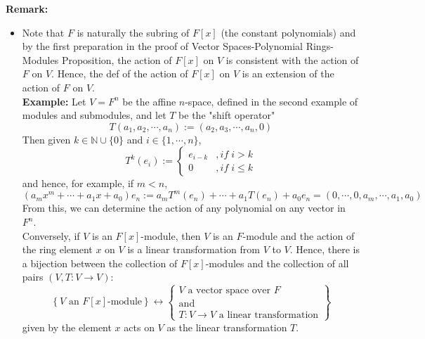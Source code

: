 \noindent\textbf{Remark:}
\begin{itemize}
    \item Note that $F$ is naturally the subring of $F[x]$ (the constant polynomials) and by the first preparation in the proof of Vector Spaces-Polynomial Rings-Modules Proposition, the action of $F[x]$ on $V$ is consistent with the action of $F$ on $V$. Hence, the def of the action of $F[x]$ on $V$ is an extension of the action of $F$ on $V$.
    \vspace{1em}\\
    
    \noindent\textbf{Example:} Let $V=F^n$ be the affine $n$-space, defined in the second example of modules and submodules, and let $T$ be the "shift operator"
    $$T(a_1 ,a_2,\cdots, a_n) := (a_2 ,a_3 ,\cdots, a_n ,0)$$
    Then given $k \in \mathbb{N} \cup \{0\}$ and $i \in \{ 1 ,\cdots, n\}$, 
    $$T^k (e_i) := \begin{cases}
        e_{i-k} &,if\;i>k\\
        0 &,if\; i \leq k
    \end{cases}$$
    and hence, for example, if $m<n$,
    $$(a_m x^m + \cdots + a_1 x+a_0) e_n := a_m T^m (e_n) + \cdots + a_1 T(e_n)+a_0 e_n = (0, \cdots, 0,a_m ,\cdots, a_1,a_0)$$
    From this, we can determine the action of any polynomial on any vector in $F^n$.
    \vspace{1em}\\
    
    \noindent Conversely, if $V$ is an $F[x]$-module, then $V$ is an $F$-module and the action of the ring element $x$ on $V$ is a linear transformation from $V$ to $V$. Hence, there is a bijection between the collection of $F[x]$-modules and the collection of all pairs $(V,T: V \to V)$:
    \[
    \left\{ V \text{ an } F[x]\text{-module} \right\} \longleftrightarrow 
    \left\{ 
    \begin{matrix}
    V \text{ a vector space over } F \\
    \text{and} \\
    T : V \to V \text{ a linear transformation}
    \end{matrix}
    \right\}
    \]
    given by the element $x$ acts on $V$ as the linear transformation $T$.


\end{itemize}
